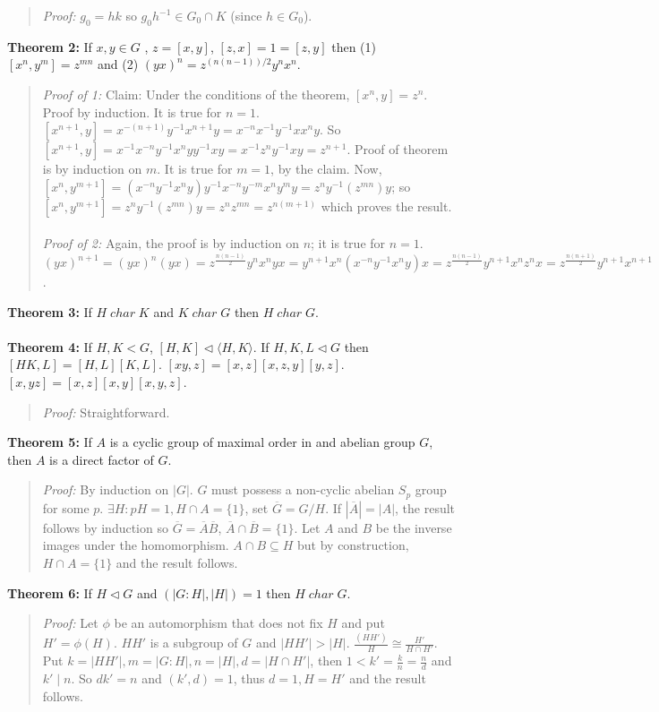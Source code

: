 \begin{quote}
\emph {Proof:}
$g_0=hk$ so $g_0 h^{-1} \in G_0 \cap K$ (since $h \in G_0$).
\end{quote}
{\bf Theorem 2:}  If $x,y \in G$ , $z=[x,y]$, $[z, x]=1=[z,y]$ then (1) $[x^n, y^m]=z^{mn}$ and
(2) $(yx)^n= z^{(n(n-1))/2}y^n x^n$.
\begin{quote}
\emph {Proof of 1:} Claim: Under the conditions of the theorem, $[x^n,y]= z^n$.  Proof by induction.
It is true for $n=1$.  $[x^{n+1},y]= x^{-(n+1)}y^{-1}x^{n+1}y= x^{-n}x^{-1} y^{-1} x x^n y$.
So $[x^{n+1},y]= x^{-1} x^{-n} y^{-1} x^n y y^{-1} x y= x^{-1} z^n y^{-1} x y= z^{n+1}$.
Proof of theorem is by induction on $m$.  It is true for $m=1$, by the claim.  Now,
$[x^n,y^{m+1}]= (x^{-n} y^{-1} x^n y) y^{-1} x^{-n} y^{-m} x^n y^m y= z^n y^{-1} (z^{mn}) y$;
so $[x^n,y^{m+1}]= z^n y^{-1} (z^{mn}) y = z^n z^{mn}= z^{n(m+1)}$ which proves the result.
\\
\\
\emph {Proof of 2:} Again, the proof is by induction on $n$; it is true for $n=1$.
$(yx)^{n+1}= (yx)^n (yx)=
z^{\frac {n(n-1)} {2}} y^n x^n y x= y^{n+1} x^n (x^{-n} y^{-1} x^n y) x
= z^{\frac {n(n-1)} {2}} y^{n+1} x^n z^n x= z^{\frac {n(n+1)} 2} y^{n+1} x^{n+1}$.
\end{quote}
{\bf Theorem 3:}
If  $H \; char \; K$ and $K \;  char \; G$ then $H \; char \; G$.
\\
\\
{\bf Theorem 4:}
If $H, K < G$, $[H,K] \lhd \langle H, K \rangle$.
If $H, K, L \lhd G$ then $[HK,L]= [H,L] [K, L]$.
$[xy,z]= [x,z] [x,z,y] [y,z]$.
$[x, yz]= [x,z] [x,y] [x,y,z]$.
\begin{quote}
\emph{Proof:}
Straightforward.
\end{quote}
{\bf Theorem 5:}
If $A$ is a cyclic group of maximal order in and abelian group $G$, then $A$ is a direct
factor of $G$.
\begin{quote}
\emph{Proof:}  By induction on $|G|$.
$G$ must possess a non-cyclic abelian $S_p$ group for some $p$.
$\exists H: pH=1, H \cap A = \{ 1 \}$, set ${\overline G}= G/H$.
If $|{\overline A}|= |A|$, the result follows by induction so
${\overline G} = {\overline A} {\overline B}$,
${\overline A} \cap {\overline B} = \{ 1 \}$.  Let $A$ and $B$ be the inverse images
under the homomorphism.  $A \cap B \subseteq H$ but by construction, $H \cap A= \{ 1 \}$
and the result follows.
\end{quote}
{\bf Theorem 6:}
If $H \lhd G$ and $(|G:H|, |H|)=1$ then $H \; char \; G$.
\begin{quote}
\emph{Proof:}  Let $\phi$ be an automorphism that does not fix $H$ and put $H'= \phi(H)$.
$H H'$ is a subgroup of $G$ and
$|H H'| > |H|$.  ${\frac {(H H')} {H}} \cong {\frac {H'} {H \cap H'}}$.
Put $k= |H H'|, m= |G:H|, n= |H|, d= | H \cap H' |$,  then $ 1 < k'= {\frac {k} {n}} =  {\frac n d}$ and $k' \mid n$.  So $dk'= n$ and $(k', d)=1$,
thus $d=1, H = H'$ and the result follows.
\end{quote}
